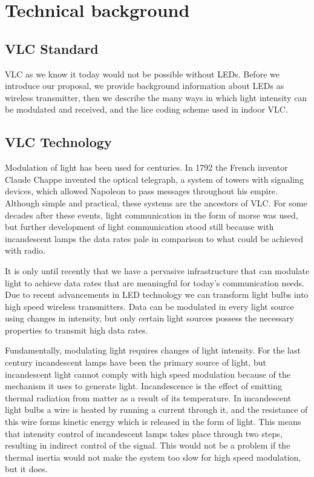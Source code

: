 \chapter{Technical background}
\label{Technical}


\section{VLC Standard}
VLC as we know it today would not be possible without LEDs. Before we introduce
our proposal, we provide background information
about LEDs as wireless transmitter, then we describe the many ways in which
light intensity can be modulated and received, and the lice coding scheme used
in indoor VLC.



\section{VLC Technology}

Modulation of light has been used for centuries. In 1792 the French inventor
Claude Chappe invented the optical telegraph, a system of towers with signaling
devices, which allowed Napoleon to pass messages throughout his empire. Although
simple and practical, these systems are the ancestors of VLC. For some decades
after these events, light communication in the form of morse was used, but further
development of light communication stood still because with incandescent lamps
the data rates pale in comparison to what could be achieved with radio.

It is only until recently that we have a pervasive infrastructure that can modulate
light to achieve data rates that are meaningful for today’s communication needs.
Due to recent advancements in LED technology we can transform light bulbs into
high speed wireless transmitters. Data can be modulated in every light source
using changes in intensity, but only certain light sources possess the necessary
properties to transmit high data rates.

Fundamentally, modulating light requires changes of light intensity. For the last
century incandescent lamps have been the primary source of light, but incandescent
light cannot comply with high speed modulation because of the mechanism
it uses to generate light. Incandescence is the effect of emitting thermal radiation
from matter as a result of its temperature. In incandescent light bulbs a wire is
heated by running a current through it, and the resistance of this wire forms kinetic 
energy which is released in the form of light. This means that intensity control
of incandescent lamps takes place through two steps, resulting in indirect control
of the signal. This would not be a problem if the thermal inertia would not make
the system too slow for high speed modulation, but it does.

